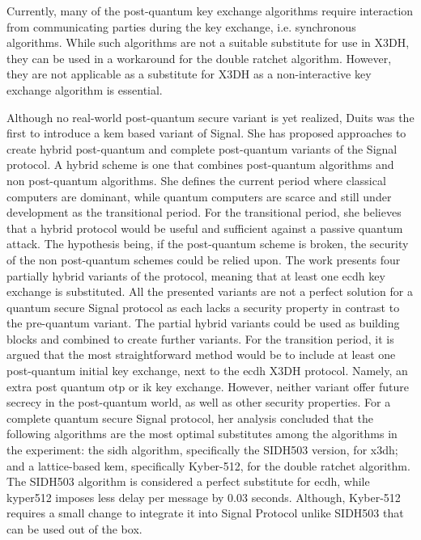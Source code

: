 Currently, many of the post-quantum key exchange algorithms require interaction from communicating parties during the key exchange, i.e. synchronous algorithms. While such algorithms are not a suitable substitute for use in X3DH, they can be used in a workaround for the double ratchet algorithm. However, they are not applicable as a substitute for X3DH as a non-interactive key exchange algorithm is essential.
\par
Although no real-world post-quantum secure variant is yet realized, Duits \cite{duits2019post} was the first to introduce a \gls{kem} based variant of Signal. She has proposed approaches to create hybrid post-quantum and complete post-quantum variants of the Signal protocol. A hybrid scheme is one that combines post-quantum algorithms and non post-quantum algorithms. She defines the current period where classical computers are dominant, while quantum computers are scarce and still under development as the transitional period. For the transitional period, she believes that a hybrid protocol would be useful and sufficient against a passive quantum attack. The hypothesis being, if the post-quantum scheme is broken, the security of the non post-quantum schemes could be relied upon. The work presents four partially hybrid variants of the protocol, meaning that at least one \gls{ecdh} key exchange is substituted. All the presented variants are not a perfect solution for a quantum secure Signal protocol as each lacks a security property in contrast to the pre-quantum variant.
The partial hybrid variants could be used as building blocks and combined to create further variants. For the transition period, it is argued that the most straightforward method would be to include at least one post-quantum initial key exchange, next to the \gls{ecdh} X3DH protocol. Namely, an extra post quantum \gls{otp} or \gls{ik} key exchange. However, neither variant offer future secrecy in the post-quantum world, as well as other security properties. For a complete quantum secure Signal protocol, her analysis concluded that the following algorithms are the most optimal substitutes among the algorithms in the experiment: the \gls{sidh} algorithm, specifically the SIDH503 version, for \gls{x3dh}; and a lattice-based \gls{kem}, specifically Kyber-512, for the double ratchet algorithm. The SIDH503 algorithm is considered a perfect substitute for \gls{ecdh}, while kyper512 imposes less delay per message by $ 0.03 $ seconds. Although, Kyber-512 requires a small change to integrate it into Signal Protocol unlike SIDH503 that can be used out of the box.
